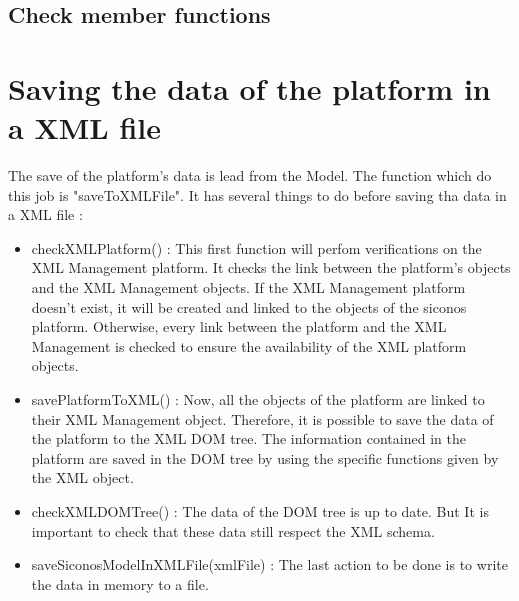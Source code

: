\subsection{Check member functions}



\clearpage
\section{Saving the data of the platform in a XML file}



The save of the platform's data is lead from the Model. The function which do this job is
"saveToXMLFile". It has several things to do before saving tha data in a XML file :
\begin{itemize}
        \item checkXMLPlatform() : This first function will perfom verifications on the XML Management platform. It checks the
        link between the platform's objects and the XML Management objects. If the XML Management
        platform doesn't exist, it will be created and linked to the objects of the \ac{siconos}
        platform. Otherwise, every link between the platform and the XML Management is checked to ensure
        the availability of the XML platform objects.
        \item savePlatformToXML() : Now, all the objects of the platform are linked to their XML Management object. Therefore,
        it is possible to save the data of the platform to the XML DOM tree. The information
        contained in the platform are saved in the DOM tree by using the specific functions given
        by the XML object.
        \item checkXMLDOMTree() : The data of the DOM tree is up to date. But It is important to check that these data still
        respect the XML schema. 
        \item saveSiconosModelInXMLFile(xmlFile) : The last action to be done is to write the data in memory to a file.
\end{itemize}
